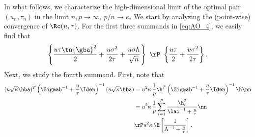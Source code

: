  In what follows, we characterize the high-dimensional limit of the optimal pair $(u_n,\tau_n)$ in the limit $n,p\rightarrow\infty,~p/n\rightarrow\kappa$.
We start by analyzing the (point-wise) convergence of $\Rc(u,\tau)$. 
For the first three summands in \eqref{eq:AO_4}, we easily find that
$$
\left\{\frac{u\tau\tn{\gba}^2}{2} + \frac{u\sigma^2}{2\tau} + \frac{u\sigma h}{\sqrt{n}}\right\}~ \rP~\left\{
\frac{u\tau}{2} + \frac{u\sigma^2}{2\tau} \right\}.
$$
Next, we study the fourth summand. First, note that
\begin{align}
(u\sqrt{\kappa}\hba)^T\left(\Sigmab^{-1}+\frac{u}{\tau}\Iden\right)^{-1}(u\sqrt{\kappa}\hba) &= u^2\kappa\,\frac{1}{p}\h^T\left(\Sigmab^{-1}+\frac{u}{\tau}\Iden\right)^{-1}\h \nn\\
&= u^2\kappa\,\frac{1}{p}\sum_{i=1}^{p}\frac{\h_i^2}{\lai^{-1}+\frac{u}{\tau}} \nn\\
&\rP u^2\kappa\,\E\left[ \frac{1}{\Lambda^{-1}+\frac{u}{\tau}} \right].
\end{align}

